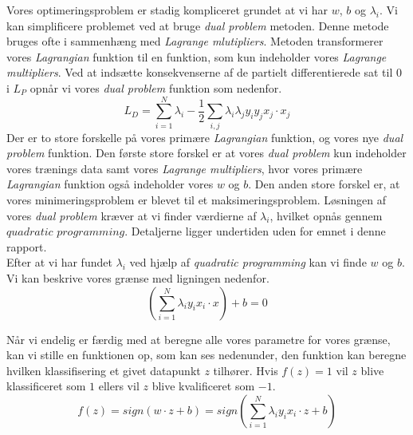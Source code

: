 \documentclass{article}
\begin{document}
Vores optimeringsproblem er stadig kompliceret grundet at vi har $w$, $b$ og $\lambda_i$. Vi kan simplificere problemet ved at bruge \textit{dual problem} metoden. Denne metode bruges ofte i sammenhæng med \textit{Lagrange mlutipliers}. Metoden transformerer vores \textit{Lagrangian} funktion til en funktion, som kun indeholder vores \textit{Lagrange multipliers}. Ved at indsætte konsekvenserne af de partielt differentierede sat til 0 i $L_P$ opnår vi vores \textit{dual problem} funktion som nedenfor.
\begin{equation}
\label{eq:L_D}
L_D = \sum\limits_{i=1}^N \lambda_i - \frac{1}{2}\sum\limits_{i,j} \lambda_i \lambda_j y_i y_j x_j \cdot x_j
\end{equation}
Der er to store forskelle på vores primære \textit{Lagrangian} funktion, og vores nye \textit{dual problem} funktion. Den første store forskel er at vores \textit{dual problem} kun indeholder vores trænings data samt vores \textit{Lagrange multipliers}, hvor vores primære \textit{Lagrangian} funktion også indeholder vores $w$ og $b$. Den anden store forskel er, at vores minimeringsproblem  er blevet til et maksimeringsproblem.
Løsningen af vores \textit{dual problem} kræver at vi finder værdierne af $\lambda_i$, hvilket opnås gennem $\textit{quadratic programming}$. Detaljerne ligger undertiden uden for emnet i denne rapport.\\
Efter at  vi har fundet $\lambda_i$ ved hjælp af \textit{quadratic programming} kan vi finde $w$ og $b$. Vi kan beskrive vores grænse med ligningen nedenfor.
\begin{equation}
\label{eq:final_opt}
( \sum\limits_{i=1}^N \lambda_i y_i x_i \cdot x) + b = 0
\end{equation}

Når vi endelig er færdig med at beregne alle vores parametre for vores grænse, kan vi stille en funktionen op, som kan ses nedenunder, den funktion kan beregne hvilken klassifisering et givet datapunkt $z$ tilhører. Hvis $f(z) = 1$ vil $z$ blive klassificeret som $1$ ellers vil $z$ blive kvalificeret som $-1$. 
\begin{equation}
\label{eq:calc_class}
f(z) = sign(w \cdot z + b) = sign( \sum\limits_{i=1}^N \lambda_i y_i x_i \cdot z + b)
\end{equation}
\end{document}
